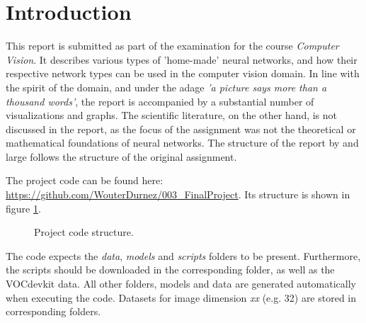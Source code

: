 
\section{Introduction}
\label{sec:intro}

This report is submitted as part of the examination for the course \textit{Computer Vision}. It describes various types of 'home-made' neural networks, and how their respective network types can be used in the computer vision domain. In line with the spirit of the domain, and under the adage \textit{'a picture says more than a thousand words'}, the report is accompanied by a substantial number of visualizations and graphs. The scientific literature, on the other hand, is not discussed in the report, as the focus of the assignment was not the theoretical or mathematical foundations of neural networks. The structure of the report by and large follows the structure of the original assignment. 

\vspace{5mm} %

The project code can be found here: \textcolor{blue}{\url{https://github.com/WouterDurnez/003_FinalProject}}. Its structure is shown in figure \ref{fig:project_structure}.

\begin{figure}[!h]
\begin{center}
\begin{minipage}{4cm}
\end{minipage}
\end{center}\caption{Project code structure.}
\label{fig:project_structure}
\end{figure}

The code expects the \textit{data}, \textit{models} and \textit{scripts} folders to be present. Furthermore, the scripts should be downloaded in the corresponding folder, as well as the VOCdevkit data. All other folders, models and data are generated automatically when executing the code. Datasets for image dimension \textit{xx} (e.g. 32) are stored in corresponding folders.

